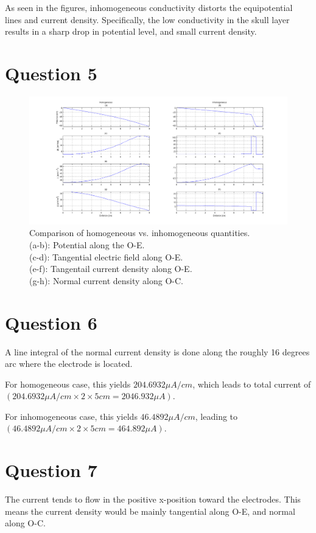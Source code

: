 \documentclass{article}
\begin{document}
As seen in the figures, inhomogeneous conductivity distorts the equipotential lines and current density. Specifically, the low conductivity in the skull layer results in a sharp drop in potential level, and small current density.

\section{Question 5}
\begin{figure}[H]
    \begin{center}
    \includegraphics[scale=0.3]{comparison.png}
    \caption{Comparison of homogeneous vs. inhomogeneous quantities.\\  (a-b): Potential along the O-E. \\  (c-d): Tangential electric field along O-E. \\ (e-f): Tangentail current density along O-E. \\  (g-h): Normal current density along O-C.}
\end{center}
\end{figure}

\section{Question 6}
A line integral of the normal current density is done along the roughly 16 degrees arc where the electrode is located. 

For homogeneous case, this yields $204.6932\mu A/cm$, which leads to total current of $(204.6932\mu A/cm \times 2 \times 5cm=2046.932\mu A)$. 

For inhomogeneous case, this yields $46.4892\mu A/cm$, leading to $(46.4892\mu A/cm \times 2 \times 5cm = 464.892\mu A)$.

\section{Question 7}
The current tends to flow in the positive x-position toward the electrodes. This means the current density would be mainly tangential along O-E, and normal along O-C.
\end{document}
